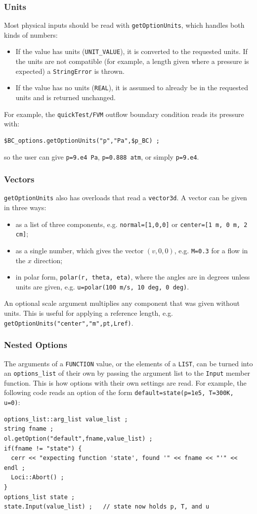 \subsubsection {Units}
%
Most physical inputs should be read with {\tt getOptionUnits}, which
handles both kinds of numbers:
\begin{itemize}
\item If the value has units ({\tt UNIT\_VALUE}), it is converted to the
  requested units.  If the units are not compatible (for example, a
  length given where a pressure is expected) a {\tt StringError} is
  thrown.
\item If the value has no units ({\tt REAL}), it is assumed to already
  be in the requested units and is returned unchanged.
\end{itemize}
For example, the {\tt quickTest/FVM} outflow boundary condition reads
its pressure with:
\begin{verbatim}
$BC_options.getOptionUnits("p","Pa",$p_BC) ;
\end{verbatim}
so the user can give \verb|p=9.e4 Pa|, \verb|p=0.888 atm|, or simply
\verb|p=9.e4|.
%
\subsubsection {Vectors}
%
{\tt getOptionUnits} also has overloads that read a {\tt vector3d}.
A vector can be given in three ways:
\begin{itemize}
\item as a list of three components, e.g. \verb|normal=[1,0,0]| or
  \verb|center=[1 m, 0 m, 2 cm]|;
\item as a single number, which gives the vector $(v,0,0)$, e.g.
  \verb|M=0.3| for a flow in the $x$ direction;
\item in polar form, \verb|polar(r, theta, eta)|, where the angles are
  in degrees unless units are given, e.g.
  \verb|u=polar(100 m/s, 10 deg, 0 deg)|.
\end{itemize}
An optional scale argument multiplies any component that was given
without units.  This is useful for applying a reference length, e.g.
{\tt getOptionUnits("center","m",pt,Lref)}.
%
\subsubsection {Nested Options}
%
The arguments of a {\tt FUNCTION} value, or the elements of a {\tt LIST},
can be turned into an {\tt options\_list} of their own by passing the
argument list to the {\tt Input} member function.  This is how
options with their own settings are read.  For example, the following
code reads an option of the form \verb|default=state(p=1e5, T=300K, u=0)|:
\begin{verbatim}
options_list::arg_list value_list ;
string fname ;
ol.getOption("default",fname,value_list) ;
if(fname != "state") {
  cerr << "expecting function 'state', found '" << fname << "'" << endl ;
  Loci::Abort() ;
}
options_list state ;
state.Input(value_list) ;   // state now holds p, T, and u
\end{verbatim}
%

